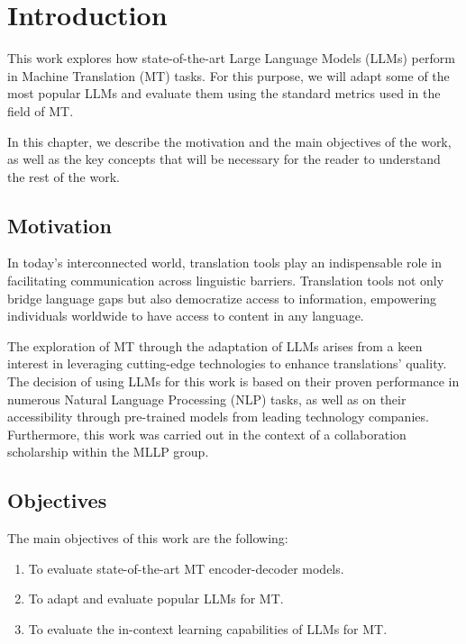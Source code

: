\documentclass[11pt,english,listoffigures,listoftables]{tfgetsinf}
\begin{document}
\mainmatter


\chapter{Introduction}
\label{chapter1}

This work explores how state-of-the-art Large Language Models (LLMs) perform in Machine Translation (MT) tasks. For this purpose, we will adapt some of the most popular LLMs and evaluate them using the standard metrics used in the field of MT. 

In this chapter, we describe the motivation and the main objectives of the work, as well as the key concepts that will be necessary for the reader to understand the rest of the work.

\section{Motivation}

In today's interconnected world, translation tools play an indispensable role in facilitating communication across linguistic barriers. Translation tools not only bridge language gaps but also democratize access to information, empowering individuals worldwide to have access to content in any language.

The exploration of MT through the adaptation of LLMs arises from a keen interest in leveraging cutting-edge technologies to enhance translations' quality. The decision of using LLMs for this work is based on their proven performance in numerous Natural Language Processing (NLP) tasks, as well as on their accessibility through pre-trained models from leading technology companies. Furthermore, this work was carried out in the context of a collaboration scholarship within the MLLP group. 

\section{Objectives}

The main objectives of this work are the following:

\begin{enumerate}
    \item To evaluate state-of-the-art MT encoder-decoder models.
    \item To adapt and evaluate popular LLMs for MT.
    \item To evaluate the in-context learning capabilities of LLMs for MT.
\end{enumerate}
\end{document}
